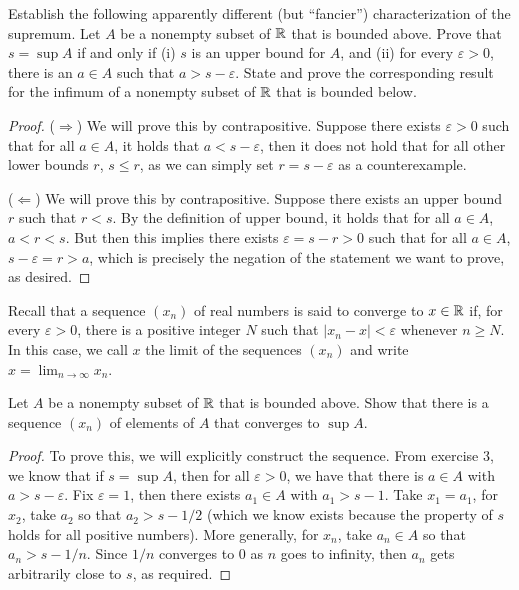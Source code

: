 \begin{exercise}{3}
Establish the following apparently different (but ``fancier'') characterization of the supremum. Let $A$ be a nonempty subset of $\mathbb{R}$ that is bounded above. Prove that $s=\sup A$ if and only if (i) $s$ is an upper bound for $A$, and (ii) for every $\varepsilon>0$, there is an $a\in A$ such that $a>s-\varepsilon$. State and prove the corresponding result for the infimum of a nonempty subset of $\mathbb{R}$ that is bounded below.
\end{exercise}
\begin{proof}
($\Rightarrow$) We will prove this by contrapositive. Suppose there exists $\varepsilon>0$ such that for all $a\in A$, it holds that $a<s-\varepsilon$, then it does not hold that for all other lower bounds $r$, $s\leq r$, as we can simply set $r=s-\varepsilon$ as a counterexample.

($\Leftarrow$) We will prove this by contrapositive. Suppose there exists an upper bound $r$ such that $r<s$. By the definition of upper bound, it holds that for all $a\in A$, $a<r<s$. But then this implies there exists $\varepsilon=s-r>0$ such that for all $a\in A$, $s-\varepsilon=r>a$, which is precisely the negation of the statement we want to prove, as desired.
\end{proof}

\begin{exercise}{4}
Recall that a sequence $(x_n)$ of real numbers is said to converge to $x\in\mathbb{R}$ if, for every $\varepsilon>0$, there is a positive integer $N$ such that $\lvert x_n-x\rvert<\varepsilon$ whenever $n\geq N$. In this case, we call $x$ the limit of the sequences $(x_n)$ and write $x=\lim_{n\to\infty}x_n$.

Let $A$ be a nonempty subset of $\mathbb{R}$ that is bounded above. Show that there is a sequence $(x_n)$ of elements of $A$ that converges to $\sup A$.
\end{exercise}
\begin{proof}
To prove this, we will explicitly construct the sequence. From exercise 3, we know that if $s=\sup A$, then for all $\varepsilon>0$, we have that there is $a\in A$ with $a>s-\varepsilon$. Fix $\varepsilon=1$, then there exists $a_1\in A$ with $a_1>s-1$. Take $x_1=a_1$, for $x_2$, take $a_2$ so that $a_2>s-1/2$ (which we know exists because the property of $s$ holds for all positive numbers). More generally, for $x_n$, take $a_n\in A$ so that $a_n>s-1/n$. Since $1/n$ converges to $0$ as $n$ goes to infinity, then $a_n$ gets arbitrarily close to $s$, as required.
\end{proof}

